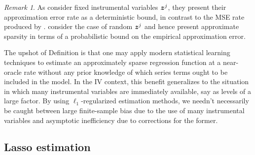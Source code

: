 \documentclass{uwstat572}
\theoremstyle{definition}
\theoremstyle{remark}
\newtheorem{rek}[thm]{Remark}
\numberwithin{equation}{section}
\begin{document}
\begin{rek} As \cite{BCH11} consider fixed instrumental variables $\boldsymbol{z}^j$, they present their approximation error rate as a deterministic bound, in contrast to the MSE rate produced by \cite{N97}. \cite{BCCH12} consider the case of random $\boldsymbol{z}^j$ and hence present approximate sparsity in terms of a probabilistic bound on the empirical approximation error. 
\end{rek}

The upshot of Definition \label{def:as} is that one may apply modern statistical learning techniques to estimate an approximately sparse regression function at a near-oracle rate without any prior knowledge of which series terms ought to be included in the model. In the IV context, this benefit generalizes to the situation in which many instrumental variables are immediately available, say as levels of a large factor. By using $\ell_1$-regularized estimation methods, we needn't necessarily be caught between large finite-sample bias due to the use of many instrumental variables and asymptotic inefficiency due to corrections for the former.  


%
% 
\subsection{Lasso estimation}
\end{document}
